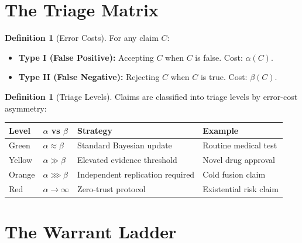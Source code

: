 \documentclass[12pt, a4paper]{article}
\theoremstyle{plain}
\theoremstyle{definition}
\newtheorem{definition}[theorem]{Definition}
\begin{document}
\section{The Triage Matrix}\label{sec:triage}

\begin{definition}[Error Costs]\label{def:errors}
  For any claim $C$:
  \begin{itemize}
    \item \textbf{Type I (False Positive):} Accepting $C$ when $C$
      is false. Cost: $\alpha(C)$.
    \item \textbf{Type II (False Negative):} Rejecting $C$ when $C$
      is true. Cost: $\beta(C)$.
  \end{itemize}
\end{definition}

\begin{definition}[Triage Levels]\label{def:triage_levels}
  Claims are classified into triage levels by error-cost asymmetry:
  \begin{center}
  \begin{tabular}{llll}
    \toprule
    \textbf{Level} & \textbf{$\alpha$ vs $\beta$} & \textbf{Strategy}
    & \textbf{Example} \\
    \midrule
    Green & $\alpha \approx \beta$ & Standard Bayesian update
    & Routine medical test \\
    Yellow & $\alpha \gg \beta$ & Elevated evidence threshold
    & Novel drug approval \\
    Orange & $\alpha \ggg \beta$ & Independent replication required
    & Cold fusion claim \\
    Red & $\alpha \to \infty$ & Zero-trust protocol
    & Existential risk claim \\
    \bottomrule
  \end{tabular}
  \end{center}
\end{definition}

\section{The Warrant Ladder}\label{sec:warrant}
\end{document}
